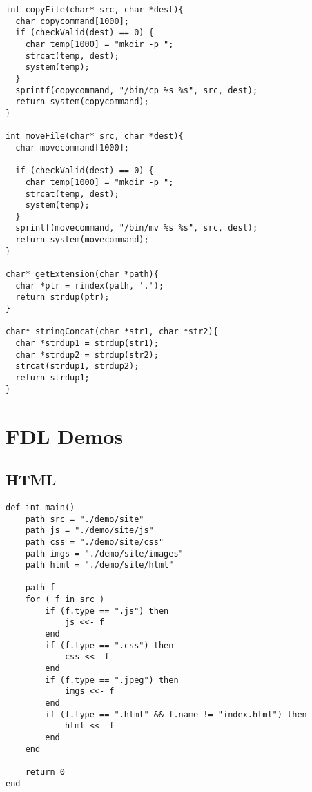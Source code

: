 \documentclass[11pt]{article}
\begin{document}
\begin{listing}[H]
  \begin{verbatim}
int copyFile(char* src, char *dest){
  char copycommand[1000];
  if (checkValid(dest) == 0) {
    char temp[1000] = "mkdir -p ";
    strcat(temp, dest);
    system(temp);
  }
  sprintf(copycommand, "/bin/cp %s %s", src, dest);
  return system(copycommand);
}

int moveFile(char* src, char *dest){
  char movecommand[1000];

  if (checkValid(dest) == 0) {
    char temp[1000] = "mkdir -p ";
    strcat(temp, dest);
    system(temp);
  }
  sprintf(movecommand, "/bin/mv %s %s", src, dest);
  return system(movecommand);
}

char* getExtension(char *path){
  char *ptr = rindex(path, '.');
  return strdup(ptr);
}

char* stringConcat(char *str1, char *str2){
  char *strdup1 = strdup(str1);
  char *strdup2 = strdup(str2);
  strcat(strdup1, strdup2);
  return strdup1;
}
  \end{verbatim}
\end{listing}

\newpage

\section{FDL Demos}

\subsection{HTML}

\begin{listing}[H]
  \begin{verbatim}
def int main()
    path src = "./demo/site"
    path js = "./demo/site/js"
    path css = "./demo/site/css"
    path imgs = "./demo/site/images"
    path html = "./demo/site/html"

    path f
    for ( f in src )
        if (f.type == ".js") then
            js <<- f
        end
        if (f.type == ".css") then
            css <<- f
        end
        if (f.type == ".jpeg") then
            imgs <<- f
        end
        if (f.type == ".html" && f.name != "index.html") then
            html <<- f
        end
    end

    return 0
end
  \end{verbatim}
\end{listing}
\end{document}

